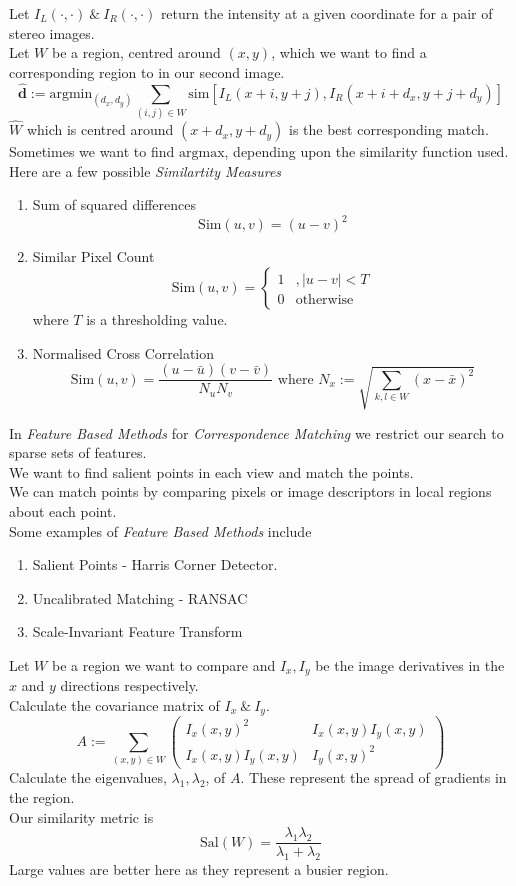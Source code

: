 \documentclass[11pt,a4paper]{article}
\begin{document}
Let $I_L(\cdot,\cdot)\ \&\ I_R(\cdot,\cdot)$ return the intensity at a given coordinate for a pair of stereo images.\\
Let $W$ be a region, centred around $(x,y)$, which we want to find a corresponding region to in our second image.
$$\hat{\textbf{d}}:=\text{argmin}_{(d_x,d_y)}\sum_{(i,j)\in W}\text{sim}[I_L(x+i,y+j),I_R(x+i+d_x,y+j+d_y)]$$
$\hat{W}$ which is centred around $(x+d_x,y+d_y)$ is the best corresponding match.\\
\nb Sometimes we want to find $\text{argmax}$, depending upon the similarity function used.\\

Here are a few possible \textit{Similartity Measures}
\begin{enumerate}
	\item Sum of squared differences
	$$\text{Sim}(u,v)=(u-v)^2$$
	\item Similar Pixel Count
	$$\text{Sim}(u,v)=\begin{cases}1&,|u-v|<T\\0&\text{otherwise}\end{cases}$$
	where $T$ is a thresholding value.
	\item Normalised Cross Correlation
	$$\text{Sim}(u,v)=\frac{(u-\bar{u})(v-\bar{v})}{N_uN_v}\text{ where }N_x:=\sqrt{\sum_{k,l\in W}(x-\bar{x})^2}$$
\end{enumerate}

In \textit{Feature Based Methods} for \textit{Correspondence Matching} we restrict our search to sparse sets of features.\\
We want to find salient points in each view and match the points.\\
We can match points by comparing pixels or image descriptors in local regions about each point.\\
Some examples of \textit{Feature Based Methods} include
\begin{enumerate}
	\item Salient Points - Harris Corner Detector.
	\item Uncalibrated Matching - RANSAC
	\item Scale-Invariant Feature Transform
\end{enumerate}

Let $W$ be a region we want to compare and $I_x,I_y$ be the image derivatives in the $x$ and $y$ directions respectively.\\
Calculate the covariance matrix of $I_x\ \&\ I_y$.
$$A:=\sum_{(x,y)\in W}\begin{pmatrix}I_x(x,y)^2&I_x(x,y)I_y(x,y)\\I_x(x,y)I_y(x,y)&I_y(x,y)^2\end{pmatrix}$$
Calculate the eigenvalues, $\lambda_1,\lambda_2$, of $A$. These represent the spread of gradients in the region.\\
Our similarity metric is
$$\text{Sal}(W)=\frac{\lambda_1\lambda_2}{\lambda_1+\lambda_2}$$
Large values are better here as they represent a busier region.\\
\end{document}

